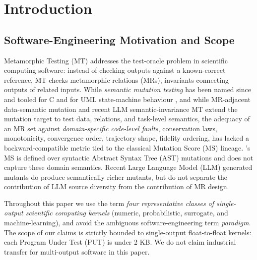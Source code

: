 \documentclass[manuscript,screen,review]{acmart}
\begin{document}
\maketitle

\section{Introduction}\label{introduction}

\subsection{Software-Engineering Motivation and Scope}\label{motivation-and-scope}

Metamorphic Testing (MT) addresses the test-oracle problem in scientific
computing software: instead of checking outputs against a known-correct
reference, MT checks metamorphic relations (MRs), invariants connecting
outputs of related inputs. While \emph{semantic mutation testing} has
been named since \citet{clark2010semanticmut} and tooled for C \citep{dan2012smtc}
and for UML state-machine behaviour \citep{derezinska2019uml}, and while
MR-adjacent data-semantic mutation \citep{sun2016mumt,sun2024datamutation,zhu2020datamorphic,chan2024metamorphic}
and recent LLM semantic-invariance MT \citep{curto2025semanticinvariance} extend the mutation target
to test data, relations, and task-level semantics, the adequacy of an MR
set against \emph{domain-specific code-level faults}, conservation laws,
monotonicity, convergence order, trajectory shape, fidelity ordering,
has lacked a backward-compatible metric tied to the classical Mutation
Score (MS) lineage. \citeauthor{jia2011analysis}'s \citeyearpar{jia2011analysis} MS is defined over syntactic
Abstract Syntax Tree (AST) mutations and does not capture these domain
semantics. Recent Large Language Model (LLM) generated mutants \citep{tip2025llmorpheus,humbatova2021deepcrime} do
produce semantically richer mutants, but do not separate the
contribution of LLM source diversity from the contribution of MR design.

Throughout this paper we use the term \emph{four representative classes
of single-output scientific computing kernels} (numeric, probabilistic,
surrogate, and machine-learning), and avoid the ambiguous
software-engineering term \emph{paradigm}. The scope of our claims is
strictly bounded to single-output float-to-float kernels: each
Program Under Test (PUT) is under 2 KB. We do not claim industrial transfer
for multi-output software in this paper.
\end{document}

